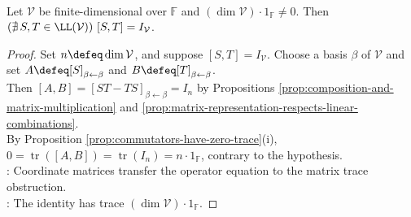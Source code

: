 \begin{corollary} \label{cor:identity-is-not-operator-commutator} \\
Let $\mathcal{V}$ be finite-dimensional over $\mathbb{F}$ and $(\dim\mathcal{V})\cdot1_{\mathbb{F}}\neq0$. Then $(\nexists\,S,T\in\LL(\mathcal{V}))\ [S,T]=I_{\mathcal{V}}$.
\begin{proof}
Set $n\defeq\dim\mathcal{V}$, and suppose $[S,T]=I_{\mathcal{V}}$. Choose a basis $\beta$ of $\mathcal{V}$ and set $A\defeq[S]_{\beta\leftarrow\beta}$ and $B\defeq[T]_{\beta\leftarrow\beta}$.\\
Then $[A,B]=[ST-TS]_{\beta\leftarrow\beta}=I_n$ by Propositions \ref{prop:composition-and-matrix-multiplication} and \ref{prop:matrix-representation-respects-linear-combinations}.\\
By Proposition \ref{prop:commutators-have-zero-trace}(i), $0=\operatorname{tr}([A,B])=\operatorname{tr}(I_n)=n\cdot1_{\mathbb{F}}$, contrary to the hypothesis.\\
: Coordinate matrices transfer the operator equation to the matrix trace obstruction.\\
: The identity has trace $(\dim\mathcal{V})\cdot1_{\mathbb{F}}$.
\end{proof}
\end{corollary}


